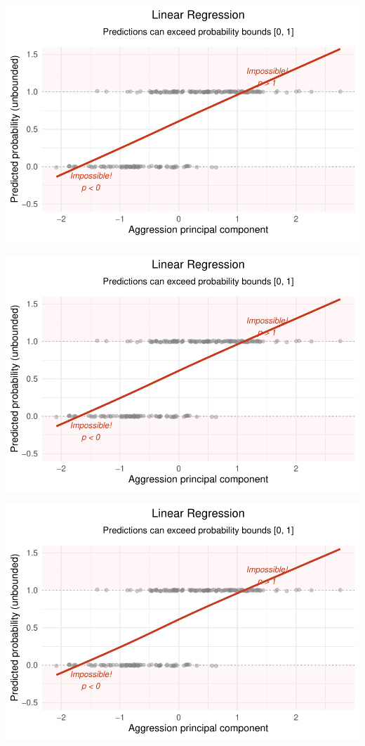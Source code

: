 \documentclass[
  letterpaper,
  DIV=11,
  numbers=noendperiod]{scrartcl}
\begin{document}
\begin{center}
\includegraphics[width=0.8\linewidth,height=\textheight,keepaspectratio]{Beyond!!!_files/figure-pdf/unnamed-chunk-4-27.pdf}
\end{center}

\begin{center}
\includegraphics[width=0.8\linewidth,height=\textheight,keepaspectratio]{Beyond!!!_files/figure-pdf/unnamed-chunk-4-28.pdf}
\end{center}

\begin{center}
\includegraphics[width=0.8\linewidth,height=\textheight,keepaspectratio]{Beyond!!!_files/figure-pdf/unnamed-chunk-4-29.pdf}
\end{center}
\end{document}
